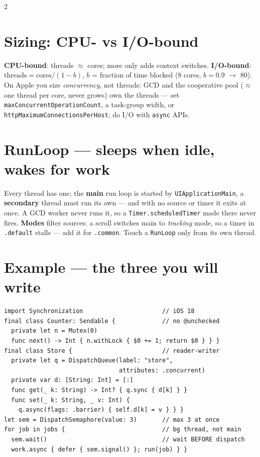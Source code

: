 \documentclass[8pt]{extarticle}
\newcommand\ct[1]{\texttt{#1}}
\begin{document}
\begin{multicols}{2}
\section{Sizing: CPU- vs I/O-bound}
\textbf{CPU-bound}: threads $\approx$ cores; more only adds context switches.
\textbf{I/O-bound}: $\mathrm{threads} = \mathrm{cores} / (1 - b)$, $b$ = fraction of time blocked
(8 cores, $b = 0.9$ $\to$ 80). On Apple
you size \emph{concurrency}, not threads: GCD and the cooperative pool
($\approx$ one thread per core, never grows) own the threads — set
\ct{maxConcurrentOperationCount}, a task-group width, or
\ct{httpMaximumConnectionsPerHost}; do I/O with \ct{async} APIs.

\columnbreak

\section{RunLoop — sleeps when idle, wakes for work}
Every thread has one; the \textbf{main} run loop is started by \ct{UIApplicationMain}, a
\textbf{secondary} thread must run its own — and with no source or timer it exits at once. A
GCD worker never runs it, so a \ct{Timer.scheduledTimer} made there never
fires\unverified. \textbf{Modes} filter sources: a scroll switches main to
\emph{tracking} mode, so a timer in \ct{.default} stalls — add it for \ct{.common}.
Touch a \ct{RunLoop} only from its own thread.

\section{Example — the three you will write}
\begin{lstlisting}[language=SwiftSheet]
import Synchronization                      // iOS 18
final class Counter: Sendable {             // no @unchecked
  private let n = Mutex(0)
  func next() -> Int { n.withLock { $0 += 1; return $0 } } }
final class Store {                         // reader-writer
  private let q = DispatchQueue(label: "store",
                                attributes: .concurrent)
  private var d: [String: Int] = [:]
  func get(_ k: String) -> Int? { q.sync { d[k] } }
  func set(_ k: String, _ v: Int) {
    q.async(flags: .barrier) { self.d[k] = v } } }
let sem = DispatchSemaphore(value: 3)       // max 3 at once
for job in jobs {                           // bg thread, not main
  sem.wait()                                // wait BEFORE dispatch
  work.async { defer { sem.signal() }; run(job) } }
\end{lstlisting}


\end{multicols}
\end{document}
